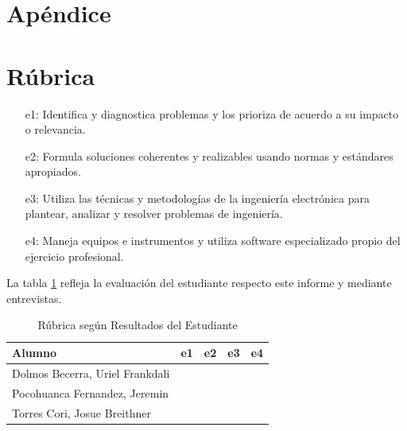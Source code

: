 \documentclass[12pt,oneside,spanish]{article}
\begin{document}
\newpage
{} %
\section*{Apéndice}

\newpage
{} %
\section*{Rúbrica}
\begin{itemize}
\item[e1:] Identifica y diagnostica problemas y los prioriza de acuerdo a su impacto o relevancia.
\item[e2:] Formula soluciones coherentes y realizables usando normas y estándares apropiados.
\item[e3:] Utiliza las técnicas y metodologías de la ingeniería electrónica para plantear, analizar y resolver problemas de ingeniería.
\item[e4:] Maneja equipos e instrumentos y utiliza software especializado propio del ejercicio profesional.
\end{itemize}
La tabla \ref{tab:rubricas} refleja la evaluación del estudiante respecto este informe y mediante entrevistas. 

\begin{table}[h!]
\caption{Rúbrica según Resultados del Estudiante}
\centering
\begin{tabular}{lcccc}
\hline 
Alumno & e1 & e2 & e3 & e4\tabularnewline
\hline 
\hline 
Dolmos Becerra, Uriel Frankdali &  &  &  & \tabularnewline
\hline 
Pocohuanca Fernandez, Jeremin &  &  &  & \tabularnewline
\hline 
Torres Cori, Josue Breithner &  &  &  & \tabularnewline
\hline
\end{tabular}
\label{tab:rubricas}
\end{table}
\end{document}
